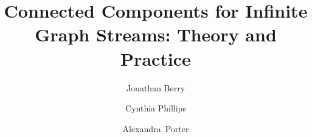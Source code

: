 


\newtheorem{defn}{Definition}
\newtheorem{invariant}{Invariant}
\newtheorem{observation}{Observation}

\newcommand{\Alex}[1]{}
\newcommand{\Jon}[1]{}
\newcommand{\Cindy}[1]{}


\newcommand{\makealgtitle}{ {\vspace{-0.2cm}  \hrule height.8pt depth0pt \kern2pt}}
\newcommand{\nodeloc}{\beta}
\newcommand{\lcloc}{\alpha}
\newcommand{\nodeusr}{\gamma}

\newcommand{\DFRns}{\mbox{DFR}}
\newcommand{\DFR}{\mbox{DFR\ }}

\newcommand{\WStreamns}{\mbox{W-Stream}}
\newcommand{\WStream}{\mbox{W-Stream\ }}

\newcommand{\XSns}{\mbox{XS}}
\newcommand{\XS}{\mbox{XS\ }}

\newcommand{\XSCCns}{\mbox{XS-CC}}
\newcommand{\XSCC}{\mbox{XS-CC\ }}

\newcommand{\XStreamns}{\mbox{X-Stream}}
\newcommand{\XStream}{\mbox{X-Stream\ }}

\newcommand{\ufns}{\mbox{union-find}}
\newcommand{\uf}{\mbox{union-find\ }}

\newcommand{\bundlens}{\mbox{bundle}}
\newcommand{\bundle}{\mbox{bundle\ }}

\MakeRobust{\Call}

%
%
%
%
%


\title{Connected Components for Infinite Graph Streams: Theory and Practice}


\author{Jonathan Berry \and Cynthia Phillips \and Alexandra\ Porter}



